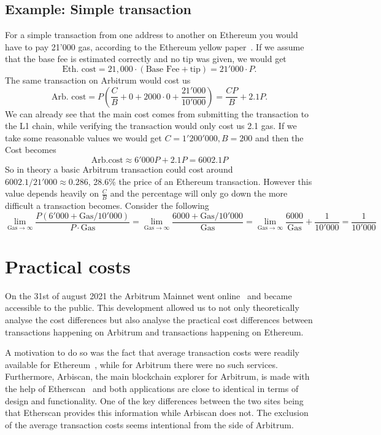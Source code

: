 \documentclass[a4paper,oneside,openright,11pt]{report}
\begin{document}
\subsection{Example: Simple transaction}
	For a simple transaction from one address to another on Ethereum you would have to pay 21'000 gas,
	according to the Ethereum yellow paper~\cite{wood2014ethereum}.
	If we assume that the base fee is estimated correctly and no tip was given, we would get
	\[
		\text{Eth. cost} = 21,000 \cdot (\text{Base Fee} + \text{tip}) = 21'000 \cdot P.
	\]
	The same transaction on Arbitrum would cost us
	\[
		\text{Arb. cost} = P(\frac{C}{B} + 0 + 2000 \cdot 0 + \frac{21'000}{10'000}) = \frac{CP}{B} + 2.1P.
	\]
	We can already see that the main cost comes from submitting the transaction to the L1 chain, while verifying the
	transaction would only cost us 2.1 gas.
	If we take some reasonable values we would get $C = 1'200'000, B = 200$ 
	and then the Cost becomes
	\[
		\text{Arb.cost} \approx 6'000 P + 2.1 P = 6002.1 P 
	\]
	So in theory a basic Arbitrum transaction could cost around $6002.1/21'000 \approx 0.286$, 28.6\% the price of
	an Ethereum transaction. However this value depends heavily on $\frac{C}{B}$ and the percentage will
	only go down the more difficult a transaction becomes. Consider the following
	\[
		\lim_{\text{Gas} \to \infty} \frac{P(6'000 + \text{Gas}/10'000)}{P \cdot \text{Gas}} = 
		\lim_{\text{Gas} \to \infty} \frac{6000 + \text{Gas}/10'000}{\text{Gas}} =
		\lim_{\text{Gas} \to \infty} \frac{6000}{\text{Gas}} + \frac{1}{10'000} =
		\frac{1}{10'000}
	\]
\section{Practical costs}
On the 31st of august 2021 the Arbitrum Mainnet went online~\cite{ArbMainNet} 
and became accessible to the public. This development allowed us to not only theoretically 
analyse the cost differences but also analyse the practical cost differences between 
transactions happening on Arbitrum and transactions happening on Ethereum.

A motivation to do so was the fact that average transaction costs were readily available for 
Ethereum~\cite{EthTxCost}, while for Arbitrum there were no such services.
Furthermore, Arbiscan, the main blockchain explorer for Arbitrum, is made 
with the help of Etherscan~\cite{ArbEthScan} and both applications are close to identical in terms
of design and functionality. One of the key differences between the two sites being that Etherscan 
provides this information while Arbiscan does not. The exclusion of the average transaction costs
seems intentional from the side of Arbitrum.
\end{document}
